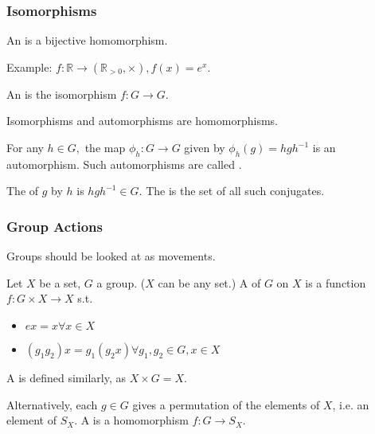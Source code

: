 \documentclass{scrartcl}
\begin{document}
\subsubsection{Isomorphisms}
\begin{definition}
	An  is a bijective homomorphism.
\end{definition}
Example: $f : \mathbb{R} \rightarrow (\mathbb{R}_{>0}, \times), f(x) = e^x$.

\begin{definition}
	An  is the isomorphism $f : G \rightarrow G$.
\end{definition}

Isomorphisms and automorphisms are homomorphisms.

\begin{proposition}
    For any $h\in G,$ the map $\phi_h : G\to G$ given by $\phi_h(g) =hgh^{-1}$ is an automorphism. Such automorphisms are called .
\end{proposition}

\begin{definition}
	The  of $g$ by $h$ is $hgh^{-1} \in G$. The  is the set of all such conjugates.
\end{definition}

\subsubsection{Group Actions}
Groups should be looked at as movements.

\begin{definition}
	Let $X$ be a set, $G$ a group. ($X$ can be any set.) A  of $G$ on $X$ is a function $f : G \times X \rightarrow X$ s.t. 
	\begin{itemize}
		\item $ex = x \forall x \in X$
		\item $(g_1g_2)x = g_1(g_2 x) \forall g_1,g_2 \in G, x \in X$
	\end{itemize}
	A  is defined similarly, as $X \times G = X$.
\end{definition}

\begin{definition}
	Alternatively, each $g \in G$ gives a permutation of the elements of $X$, i.e. an element of $S_X$. A  is a homomorphism $f : G \rightarrow S_X$.
\end{definition}
\end{document}
